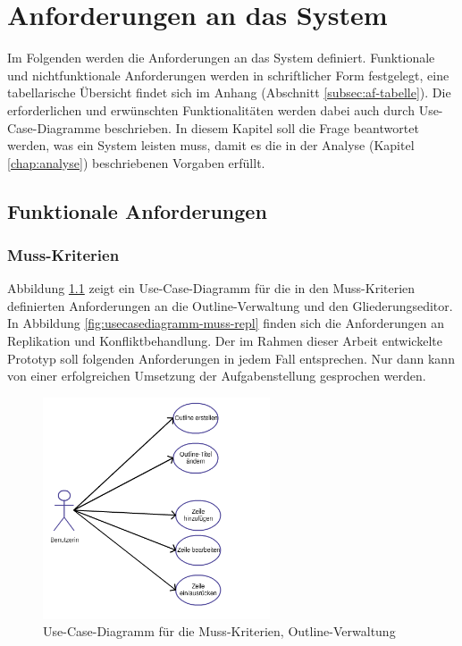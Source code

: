 \chapter{Anforderungen an das System}
\label{chap:systemanforderungen}

Im Folgenden werden die Anforderungen an das System definiert. Funktionale und nichtfunktionale Anforderungen werden in schriftlicher Form festgelegt, eine tabellarische Übersicht findet sich im Anhang (Abschnitt \ref{subsec:af-tabelle}). Die erforderlichen und erwünschten Funktionalitäten werden dabei auch durch Use-Case-Diagramme beschrieben. In diesem Kapitel soll die Frage beantwortet werden, was ein System leisten muss, damit es die in der Analyse (Kapitel \ref{chap:analyse}) beschriebenen Vorgaben erfüllt.

\section{Funktionale Anforderungen}
\label{sec:funktionale-af}

\subsection{Muss-Kriterien}
\label{subsec:muss}

 
Abbildung \ref{fig:usecasediagramm-muss-editor} zeigt ein Use-Case-Diagramm für die in den Muss-Kriterien definierten Anforderungen an die Outline-Verwaltung und den Gliederungseditor. In Abbildung \ref{fig:usecasediagramm-muss-repl} finden sich die Anforderungen an Replikation und Konfliktbehandlung. Der im Rahmen dieser Arbeit entwickelte Prototyp soll folgenden Anforderungen in jedem Fall entsprechen. Nur dann kann von einer erfolgreichen Umsetzung der Aufgabenstellung gesprochen werden. 

\medskip
\begin{figure}[ht] 
  \begin{center}
  \includegraphics[width=0.6\textwidth]{grafik/usecasediagramm-muss-editor} 
  \end{center}
  \caption{Use-Case-Diagramm für die Muss-Kriterien, Outline-Verwaltung}
  \label{fig:usecasediagramm-muss-editor} 
\end{figure}

